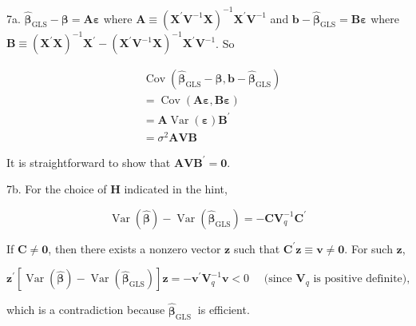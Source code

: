 \documentclass[10pt]{article}
\begin{document}
7a. $\widehat{\boldsymbol{\beta}}_{\mathrm{GLS}}-\boldsymbol{\beta}=\mathbf{A} \boldsymbol{\varepsilon}$ where $\mathbf{A} \equiv\left(\mathbf{X}^{\prime} \mathbf{V}^{-1} \mathbf{X}\right)^{-1} \mathbf{X}^{\prime} \mathbf{V}^{-1}$ and $\mathbf{b}-\widehat{\boldsymbol{\beta}}_{\mathrm{GLS}}=\mathbf{B} \boldsymbol{\varepsilon}$ where $\mathbf{B} \equiv\left(\mathbf{X}^{\prime} \mathbf{X}\right)^{-1} \mathbf{X}^{\prime}-\left(\mathbf{X}^{\prime} \mathbf{V}^{-1} \mathbf{X}\right)^{-1} \mathbf{X}^{\prime} \mathbf{V}^{-1}$. So

$$
\begin{aligned}
& \operatorname{Cov}\left(\widehat{\boldsymbol{\beta}}_{\mathrm{GLS}}-\boldsymbol{\beta}, \mathbf{b}-\widehat{\boldsymbol{\beta}}_{\mathrm{GLS}}\right) \\
& =\operatorname{Cov}(\mathbf{A} \boldsymbol{\varepsilon}, \mathbf{B} \boldsymbol{\varepsilon}) \\
& =\mathbf{A} \operatorname{Var}(\boldsymbol{\varepsilon}) \mathbf{B}^{\prime} \\
& =\sigma^{2} \mathbf{A V B}
\end{aligned}
$$

It is straightforward to show that $\mathbf{A V B}^{\prime}=\mathbf{0}$.

7b. For the choice of $\mathbf{H}$ indicated in the hint,

$$
\operatorname{Var}(\widehat{\boldsymbol{\beta}})-\operatorname{Var}\left(\widehat{\boldsymbol{\beta}}_{\mathrm{GLS}}\right)=-\mathbf{C V}_{q}^{-1} \mathbf{C}^{\prime}
$$

If $\mathbf{C} \neq \mathbf{0}$, then there exists a nonzero vector $\mathbf{z}$ such that $\mathbf{C}^{\prime} \mathbf{z} \equiv \mathbf{v} \neq \mathbf{0}$. For such $\mathbf{z}$,

$$
\mathbf{z}^{\prime}\left[\operatorname{Var}(\widehat{\boldsymbol{\beta}})-\operatorname{Var}\left(\widehat{\boldsymbol{\beta}}_{\mathrm{GLS}}\right)\right] \mathbf{z}=-\mathbf{v}^{\prime} \mathbf{V}_{q}^{-1} \mathbf{v}<0 \quad \text { (since } \mathbf{V}_{q} \text { is positive definite), }
$$

which is a contradiction because $\widehat{\boldsymbol{\beta}}_{\text {GLS }}$ is efficient.
\end{document}
